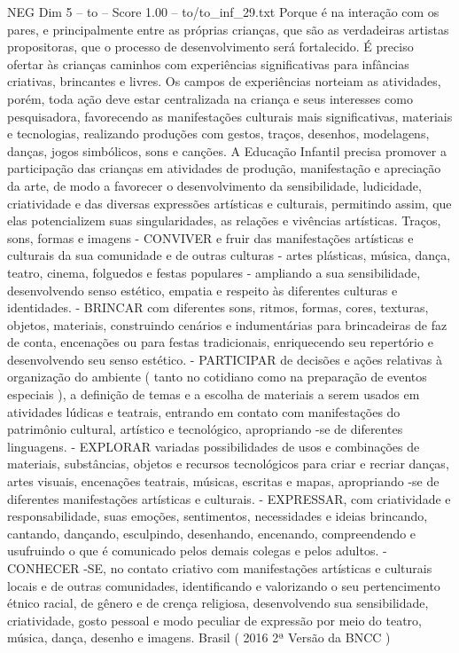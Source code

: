\begin{textsample}{NEG Dim 5 – to – Score 1.00 – to/to\_inf\_29.txt}
Porque é na interação com os pares, e principalmente entre as próprias crianças, que são as verdadeiras artistas propositoras, que o processo de desenvolvimento será fortalecido.
É preciso ofertar às crianças caminhos com experiências significativas para infâncias criativas, brincantes e livres.
Os campos de experiências norteiam as atividades, porém, toda ação deve estar centralizada na criança e seus interesses como pesquisadora, favorecendo as manifestações culturais mais significativas, materiais e tecnologias, realizando produções com gestos, traços, desenhos, modelagens, danças, jogos simbólicos, sons e canções.
A Educação Infantil precisa promover a participação das crianças em atividades de produção, manifestação e apreciação da arte, de modo a favorecer o desenvolvimento da sensibilidade, ludicidade, criatividade e das diversas expressões artísticas e culturais, permitindo assim, que elas potencializem suas singularidades, as relações e vivências artísticas.
Traços, sons, formas e imagens - CONVIVER e fruir das manifestações artísticas e culturais da sua comunidade e de outras culturas - artes plásticas, música, dança, teatro, cinema, folguedos e festas populares - ampliando a sua sensibilidade, desenvolvendo senso estético, empatia e respeito às diferentes culturas e identidades. - BRINCAR com diferentes sons, ritmos, formas, cores, texturas, objetos, materiais, construindo cenários e indumentárias para brincadeiras de faz de conta, encenações ou para festas tradicionais, enriquecendo seu repertório e desenvolvendo seu senso estético. - PARTICIPAR de decisões e ações relativas à organização do ambiente ( tanto no cotidiano como na preparação de eventos especiais ), a definição de temas e a escolha de materiais a serem usados em atividades lúdicas e teatrais, entrando em contato com manifestações do patrimônio cultural, artístico e tecnológico, apropriando -se de diferentes linguagens. - EXPLORAR variadas possibilidades de usos e combinações de materiais, substâncias, objetos e recursos tecnológicos para criar e recriar danças, artes visuais, encenações teatrais, músicas, escritas e mapas, apropriando -se de diferentes manifestações artísticas e culturais. - EXPRESSAR, com criatividade e responsabilidade, suas emoções, sentimentos, necessidades e ideias brincando, cantando, dançando, esculpindo, desenhando, encenando, compreendendo e usufruindo o que é comunicado pelos demais colegas e pelos adultos. - CONHECER -SE, no contato criativo com manifestações artísticas e culturais locais e de outras comunidades, identificando e valorizando o seu pertencimento étnico racial, de gênero e de crença religiosa, desenvolvendo sua sensibilidade, criatividade, gosto pessoal e modo peculiar de expressão por meio do teatro, música, dança, desenho e imagens.
Brasil ( 2016 2ª Versão da BNCC )

\end{textsample}
